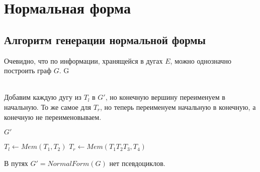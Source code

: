 \section{Нормальная форма}

\subsection*{Алгоритм генерации нормальной формы}
\begin{algorithmic}[1]
        \State Очевидно, что по информации, хранящейся в дугах $E$, можно однозначно построить граф $G$.
        \State \Return G
    \EndFunction
    
    \\
        \State Добавим каждую дугу из $T_l$ в $G'$, но конечную вершину переименуем в начальную.
        \State То же самое для $T_r$, но теперь переименуем начальную в конечную, а конечную не переименовываем.

        \State \Return $G'$
    \EndFunction
    \\

                \State $T_l \gets Mem(T_1, T_2)$
                \State $T_r \gets Mem(T_1 T_2 T_3, T_4)$
                \EndIf
            \EndFor
        \EndFor

        \State {}
    \EndFunction
\end{algorithmic}

\begin{theorem}
    В путях $G' = NormalForm(G)$ нет псевдоциклов.
\end{theorem}

